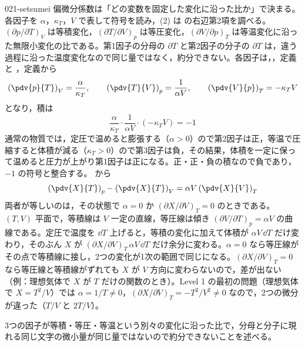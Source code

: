 \documentclass[uplatex,dvipdfmx,a4paper,11pt]{jsarticle}
\begin{document}
\begin{kaisetsu}{021-setsumei}
\houshin 偏微分係数は「どの変数を固定した変化に沿った比か」で決まる。各因子を $\alpha$，$\kappa_{T}$，$V$ で表して符号を読み，(2) は  の右辺第2項を調べる。
\keisan {} $(\partial p/\partial T)_{V}$ は等積変化，$(\partial T/\partial V)_{p}$ は等圧変化，$(\partial V/\partial p)_{T}$ は等温変化に沿った無限小変化の比である。第1因子の分母の $\partial T$ と第2因子の分子の $\partial T$ は，違う過程に沿った温度変化なので同じ量ではなく，約分できない。各因子は，，定義と ，定義から
\[ \left(\pdv{p}{T}\right)_{V} = \frac{\alpha}{\kappa_{T}}, \qquad \left(\pdv{T}{V}\right)_{p} = \frac{1}{\alpha V}, \qquad \left(\pdv{V}{p}\right)_{T} = -\kappa_{T}V \]
となり，積は
\[ \frac{\alpha}{\kappa_{T}}\cdot\frac{1}{\alpha V}\cdot(-\kappa_{T}V) = -1 \]
通常の物質では，定圧で温めると膨張する（$\alpha > 0$）ので第2因子は正，等温で圧縮すると体積が減る（$\kappa_{T} > 0$）ので第3因子は負，その結果，体積を一定に保って温めると圧力が上がり第1因子は正になる。正・正・負の積なので負であり，$-1$ の符号と整合する。
  から
\[ \left(\pdv{X}{T}\right)_{p} - \left(\pdv{X}{T}\right)_{V} = \alpha V\left(\pdv{X}{V}\right)_{T} \]
両者が等しいのは，その状態で $\alpha = 0$ か $(\partial X/\partial V)_{T} = 0$ のときである。$(T,V)$ 平面で，等積線は $V$ 一定の直線，等圧線は傾き $(\partial V/\partial T)_{p} = \alpha V$ の曲線である。定圧で温度を $\dd T$ 上げると，等積の変化に加えて体積が $\alpha V\,\dd T$ だけ変わり，そのぶん $X$ が $(\partial X/\partial V)_{T}\,\alpha V\,\dd T$ だけ余分に変わる。$\alpha = 0$ なら等圧線がその点で等積線に接し，2つの変化が1次の範囲で同じになる。$(\partial X/\partial V)_{T} = 0$ なら等圧線と等積線がずれても $X$ が $V$ 方向に変わらないので，差が出ない（例：理想気体で $X$ が $T$ だけの関数のとき）。Level 1 の最初の問題（理想気体で $X = T^{2}/V$）では $\alpha = 1/T \neq 0$，$(\partial X/\partial V)_{T} = -T^{2}/V^{2} \neq 0$ なので，2つの微分が違った（$T/V$ と $2T/V$）。
\begin{ronten}
  \item {} 3つの因子が等積・等圧・等温という別々の変化に沿った比で，分母と分子に現れる同じ文字の微小量が同じ量ではないので約分できないことを述べる。

\end{ronten}
\end{kaisetsu}
\end{document}
